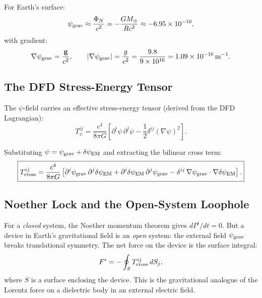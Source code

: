 \documentclass[11pt]{article}
\begin{document}
For Earth's surface:
\begin{equation}
\psi_{\rm grav} \approx \frac{\Phi_N}{c^2} = -\frac{GM_\oplus}{Rc^2}
  \approx -6.95 \times 10^{-10},
\end{equation}
with gradient:
\begin{equation}\label{eq:grad-psi-grav}
\nabla\psi_{\rm grav} = \frac{\mathbf{g}}{c^2},
  \qquad |\nabla\psi_{\rm grav}| = \frac{g}{c^2}
  = \frac{9.8}{9 \times 10^{16}} = 1.09 \times 10^{-16}\,\text{m}^{-1}.
\end{equation}

\subsection{The DFD Stress-Energy Tensor}

The $\psi$-field carries an effective stress-energy tensor (derived from the
DFD Lagrangian):
\begin{equation}
T^{ij}_\psi = \frac{c^4}{8\pi G}\left[
  \partial^i\psi\,\partial^j\psi
  - \frac{1}{2}\delta^{ij}(\nabla\psi)^2
\right].
\end{equation}

Substituting $\psi = \psi_{\rm grav} + \delta\psi_{\rm EM}$ and extracting
the bilinear cross term:
\begin{equation}\label{eq:cross-stress}
\boxed{
T^{ij}_{\rm cross} = \frac{c^4}{8\pi G}\left[
  \partial^i\psi_{\rm grav}\,\partial^j\delta\psi_{\rm EM}
  + \partial^i\delta\psi_{\rm EM}\,\partial^j\psi_{\rm grav}
  - \delta^{ij}\,\nabla\psi_{\rm grav}\cdot\nabla\delta\psi_{\rm EM}
\right].
}
\end{equation}

\subsection{Noether Lock and the Open-System Loophole}

For a \textit{closed} system, the Noether momentum theorem gives
$dP^i/dt = 0$. But a device in Earth's gravitational field is an
\textit{open} system: the external field $\psi_{\rm grav}$ breaks
translational symmetry. The net force on the device is the surface
integral:
\begin{equation}\label{eq:surface-force}
F^i = -\oint_S T^{ij}_{\rm cross}\,dS_j,
\end{equation}
where $S$ is a surface enclosing the device. This is the gravitational
analogue of the Lorentz force on a dielectric body in an external
electric field.
\end{document}
